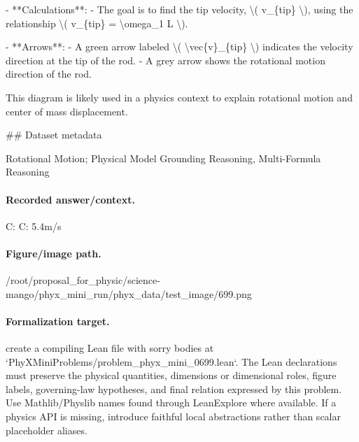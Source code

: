 - **Calculations**:
  - The goal is to find the tip velocity, \textbackslash{}( v\_\{tip\} \textbackslash{}), using the relationship \textbackslash{}( v\_\{tip\} = \textbackslash{}omega\_1 L \textbackslash{}).

- **Arrows**:
  - A green arrow labeled \textbackslash{}( \textbackslash{}vec\{v\}\_\{tip\} \textbackslash{}) indicates the velocity direction at the tip of the rod.
  - A grey arrow shows the rotational motion direction of the rod.

This diagram is likely used in a physics context to explain rotational motion and center of mass displacement.

\#\# Dataset metadata

Rotational Motion; Physical Model Grounding Reasoning, Multi-Formula Reasoning

\paragraph{Recorded answer/context.}
C: C: 5.4m/s

\paragraph{Figure/image path.}
/root/proposal\_for\_physic/science-mango/phyx\_mini\_run/phyx\_data/test\_image/699.png

\paragraph{Formalization target.}
create a compiling Lean file with sorry bodies at `PhyXMiniProblems/problem\_phyx\_mini\_0699.lean`. The Lean declarations must preserve the physical quantities, dimensions or dimensional roles, figure labels, governing-law hypotheses, and final relation expressed by this problem.
Use Mathlib/Physlib names found through LeanExplore where available. If a physics API is missing, introduce faithful local abstractions rather than scalar placeholder aliases.

